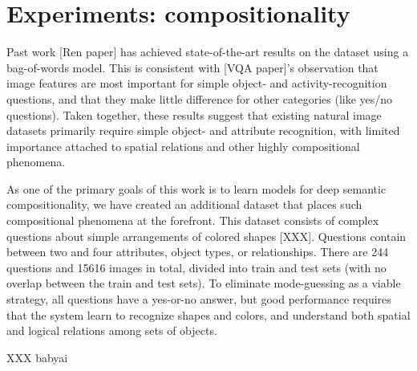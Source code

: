 \documentclass[10pt,twocolumn,letterpaper]{article}
\begin{document}
\section{Experiments: compositionality}

Past work [Ren paper] has achieved state-of-the-art results on the \cocoqa
dataset using a bag-of-words model. This is consistent with [VQA paper]'s
observation that image features are most important for simple object- and
activity-recognition questions, and that they make little difference for other
categories (like yes/no questions). Taken together, these results suggest that
existing natural image datasets primarily require simple object- and attribute
recognition, with limited importance attached to spatial relations and other
highly compositional phenomena.

As one of the primary goals of this work is to learn models for deep semantic
compositionality, we have created an additional dataset that places such
compositional phenomena at the forefront. This dataset consists of complex
questions about simple arrangements of colored shapes [XXX].  Questions contain
between two and four attributes, object types, or relationships.  There are 244
questions and 15616 images in total, divided into train and test sets (with no
overlap between the train and test sets).  To eliminate mode-guessing as a
viable strategy, all questions have a yes-or-no answer, but good performance
requires that the system learn to recognize shapes and colors, and understand
both spatial and logical relations among sets of objects.

XXX babyai
\end{document}
